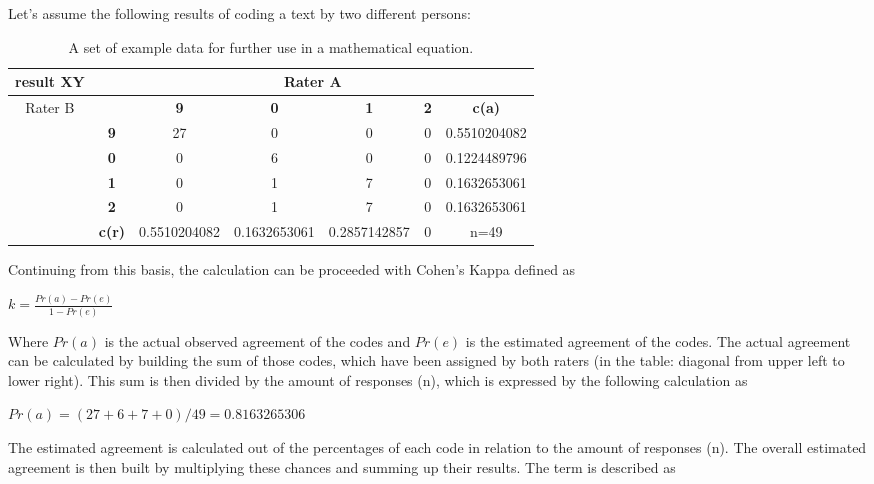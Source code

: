 Let's assume the following results of coding a text by two different persons:

\begin{table}[H]
\begin{center}
\begin{tabular}{|c|c|c|c|c|c|c|}
\hline
result XY & \multicolumn{6}{c|}{Rater A}\\\hline
 \multirow{6}{*}{Rater B}& & \textbf{9} & \textbf{0} & \textbf{1} & \textbf{2} & \textbf{c(a) }\\\cline{2-7}
 & \textbf{9}& 27	&0&	0	&0 & 0.5510204082\\\cline{2-7}
&\textbf{0}	&0	&6	&0	&0&0.1224489796\\\cline{2-7}
&\textbf{1}	&0	&1	&7	&0&0.1632653061\\\cline{2-7}
&\textbf{2}	&0	&1	&7	&0&0.1632653061\\\cline{2-7}
&\textbf{c(r)} & 0.5510204082 & 0.1632653061 & 0.2857142857 & 0& n=49\\\hline

\end{tabular}
\caption[Example data for mathematical equations]{A set of example data for further use in a mathematical equation.  }
\end{center}
\end{table}

Continuing from this basis, the calculation can be proceeded with Cohen's Kappa defined as

\begin{center}
$k=\frac{Pr(a) - Pr(e)}{1 - Pr(e)}$
\end{center}

Where $Pr(a)$ is the actual observed agreement of the codes and $Pr(e)$ is the estimated agreement of the codes. The actual agreement can be calculated by building the sum of those codes, which have been assigned by both raters (in the table: diagonal from upper left to lower right). This sum is then divided by the amount of responses (n), which is expressed by the following calculation as 

\begin{center}
$Pr(a) = ( 27 + 6 + 7 + 0 ) / 49 = 0.8163265306$
\end{center}

The estimated agreement is calculated out of the percentages of each code in relation to the amount of responses (n). The overall estimated agreement is then built by multiplying these chances and summing up their results. The term is described as

